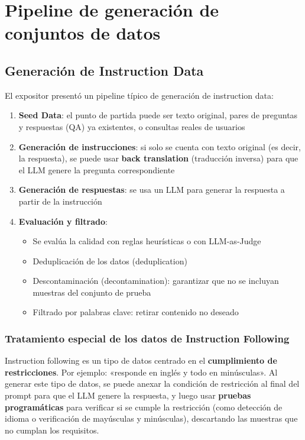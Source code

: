 \section{Pipeline de generación de conjuntos de datos}

\subsection{Generación de Instruction Data}

El expositor presentó un pipeline típico de generación de instruction data:

\begin{enumerate}
    \item \textbf{Seed Data}: el punto de partida puede ser texto original, pares de preguntas y respuestas (QA) ya existentes, o consultas reales de usuarios
    \item \textbf{Generación de instrucciones}: si solo se cuenta con texto original (es decir, la respuesta), se puede usar \textbf{back translation} (traducción inversa) para que el LLM genere la pregunta correspondiente
    \item \textbf{Generación de respuestas}: se usa un LLM para generar la respuesta a partir de la instrucción
    \item \textbf{Evaluación y filtrado}:
    \begin{itemize}
        \item Se evalúa la calidad con reglas heurísticas o con LLM-as-Judge
        \item Deduplicación de los datos (deduplication)
        \item Descontaminación (decontamination): garantizar que no se incluyan muestras del conjunto de prueba
        \item Filtrado por palabras clave: retirar contenido no deseado
    \end{itemize}
\end{enumerate}

\subsubsection{Tratamiento especial de los datos de Instruction Following}

Instruction following es un tipo de datos centrado en el \textbf{cumplimiento de restricciones}. Por ejemplo: «responde en inglés y todo en minúsculas». Al generar este tipo de datos, se puede anexar la condición de restricción al final del prompt para que el LLM genere la respuesta, y luego usar \textbf{pruebas programáticas} para verificar si se cumple la restricción (como detección de idioma o verificación de mayúsculas y minúsculas), descartando las muestras que no cumplan los requisitos.

